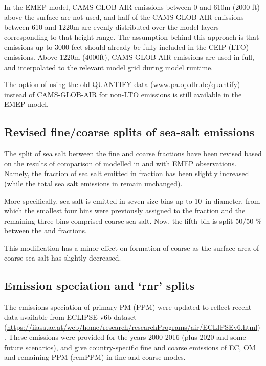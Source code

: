 In the EMEP model, CAMS-GLOB-AIR emissions between 0 and 610m (2000 ft) above the surface are not used, and half of the CAMS-GLOB-AIR emissions between 610 and 1220m are evenly distributed over the model layers corresponding to that height range. The assumption behind this approach is that emissions up to 3000 feet should already be fully included in the CEIP (LTO) emissions. Above 1220m (4000ft), CAMS-GLOB-AIR emissions are used in full, and interpolated to the relevant model grid during model runtime.

The option of using the old QUANTIFY data (\url{www.pa.op.dlr.de/quantify}) instead of CAMS-GLOB-AIR for non-LTO emissions is still available in the EMEP model.

\subsection{Revised fine/coarse splits of sea-salt emissions}
\label{ssec:updateSS}

The split of sea salt between the fine and coarse fractions have been revised based on the results of comparison of modelled  in \PM[2.5] and \PM[10] with EMEP observations. Namely, the fraction of sea salt emitted in \PM[2.5] fraction has been slightly increased (while the total sea salt emissions in \PM[10] remain unchanged). 

More specifically, sea salt is emitted in seven size bins up to 10~\um in diameter, from which the smallest four bins were previously assigned to the \PM[2.5] fraction and the remaining three bins comprised coarse sea salt. Now, the fifth bin is split 50/50 \% between the \PM[2.5] and \PM[2.5-10] fractions.  


This modification has a minor effect on formation of coarse  as the surface area of coarse sea salt has slightly decreased.



\subsection{Emission speciation and `rnr' splits}
\label{ssec:emissplits}

The emissions speciation of primary PM (PPM) were updated
to reflect recent data available from
ECLIPSE v6b dataset
(\url{https://iiasa.ac.at/web/home/research/researchPrograms/air/ECLIPSEv6.html}).
These emissions were provided for the years 2000-2016 (plus 2020 and some future
scenarios), and give country-specific fine and coarse emissions of EC, OM and remaining
PPM (remPPM) in fine and coarse modes.

